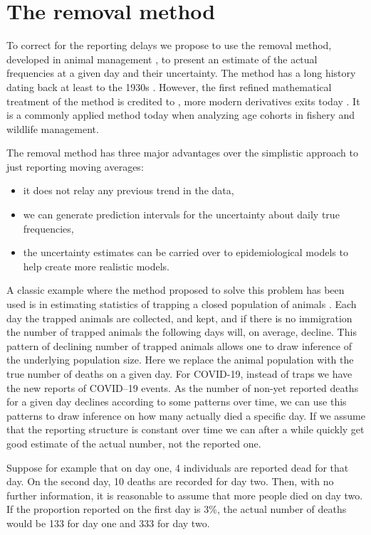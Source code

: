 \documentclass[a4paper,11pth]{article}
\begin{document}
\section{The removal method}
To correct for the reporting delays we propose to use the removal method, developed in animal management \citep{Pollock1991_review_papers}, to present an estimate of the actual frequencies at a given day and their uncertainty. The method has a long history dating back at least to the 1930s \citep{Leslie1939_attempt_determine}. However, the first refined mathematical treatment of the method is credited to \citet{Moran1951_mathematical_theory}, more modern derivatives exits today \citep{Matechou2016_open_models}. It is a commonly applied method today when analyzing age cohorts in fishery and wildlife management.

The removal method has three major advantages over the simplistic approach to just reporting moving averages:

\begin{itemize}
	\item it does not relay any previous trend in the data,
	\item we can generate prediction intervals for the uncertainty about daily true frequencies,
	\item the uncertainty estimates can be carried over to epidemiological models to help create more realistic models.
\end{itemize}

A classic example where the method proposed to solve this problem has been used is in estimating statistics of trapping a closed population of animals \citep{Pollock1991_review_papers}. Each day the trapped animals are collected, and kept, and if there is no immigration the number of trapped animals the following days will, on average, decline. This pattern of declining number of trapped animals allows one to draw inference of the underlying population size. Here we replace the animal population with the true number of deaths on a given day. For COVID-19, instead of traps we have the new reports of COVID--19 events. As the number of non-yet reported deaths for a given day declines according to some patterns over time, we can use this patterns to draw inference on how many actually died a specific day. If we assume that the reporting structure is constant over time we can after a while quickly get good estimate of the actual number, not the reported one.

Suppose for example that on day one, 4 individuals are reported dead for that day. On the second day, 10 deaths are recorded for day two. Then, with no further information, it is reasonable to assume that more people died on day two. If the proportion reported on the first day is 3\%, the actual number of deaths would be 133 for day one and 333 for day two.
\end{document}
